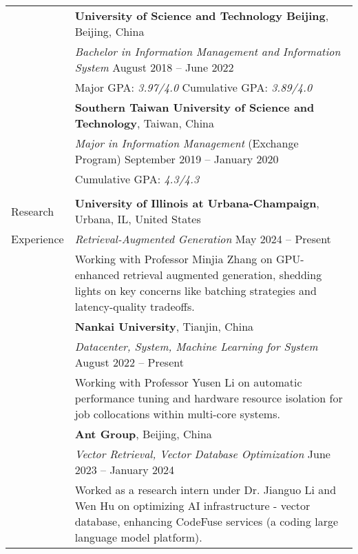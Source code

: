 \documentclass[letterpaper, 10pt]{article}
\begin{document}
\begin{longtable}{p{}p{}}
& \textbf{University of Science and Technology Beijing}, Beijing, China \\ 
& \textit{Bachelor in Information Management and Information System} \hfill August 2018 -- June 2022 \\
& Major GPA: \textit{3.97/4.0} \hspace{0.04\textwidth} Cumulative GPA: \textit{3.89/4.0}
\vspace{0.01\textwidth} \\

& \textbf{Southern Taiwan University of Science and Technology}, Taiwan, China \\ 
& \textit{Major in Information Management} (Exchange Program) \hfill September 2019 -- January 2020 \\
& Cumulative GPA: \textit{4.3/4.3} \\
& \\

\textcolor{OliveGreen}{Research}
& \textbf{University of Illinois at Urbana-Champaign}, Urbana, IL, United States \\ 
\textcolor{OliveGreen}{Experience} & \textit{Retrieval-Augmented Generation} \hfill May 2024 -- Present \\
&  Working with Professor Minjia Zhang on GPU-enhanced retrieval augmented generation, shedding lights on key concerns like batching strategies and
latency-quality tradeoffs.
\vspace{0.01\textwidth} \\


& \textbf{Nankai University}, Tianjin, China \\ 
& \textit{Datacenter, System, Machine Learning for System} \hfill August 2022 -- Present \\
&  Working with Professor Yusen Li on automatic performance tuning and hardware resource isolation for job collocations within multi-core systems.
\vspace{0.01\textwidth} \\


& \textbf{Ant Group}, Beijing, China \\ 
& \textit{Vector Retrieval, Vector Database Optimization} \hfill June 2023 -- January 2024 \\
&  Worked as a research intern under Dr. Jianguo Li and Wen Hu on optimizing AI infrastructure - vector database, enhancing CodeFuse services (a coding large language model platform).
\vspace{0.01\textwidth} \\



\end{longtable}
\end{document}
